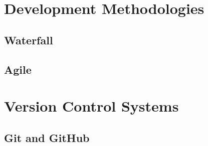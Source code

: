 \section{Development Methodologies}

\subsection{Waterfall}

\subsection{Agile}

\section{Version Control Systems}

\subsection{Git and GitHub}
